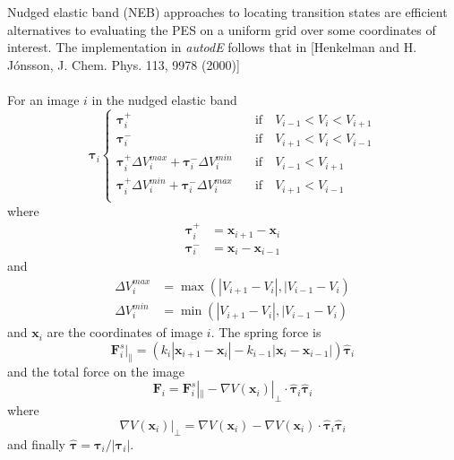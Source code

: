 \documentclass[10pt]{article}
\begin{document}
Nudged elastic band (NEB) approaches to locating transition states are efficient alternatives to evaluating the PES on a uniform grid over some coordinates of interest. The implementation in \emph{autodE} follows that in [Henkelman and H. Jónsson, J. Chem. Phys. 113, 9978 (2000)]
\\\\
For an image $i$ in the nudged elastic band
\begin{equation}
\boldsymbol{\tau}_i
\begin{cases}
\boldsymbol{\tau}_i^+ &\quad\text{if}\quad V_{i-1} < V_i < V_{i+1} \\
\boldsymbol{\tau}_i^- &\quad\text{if}\quad V_{i+1} < V_i < V_{i-1} \\
\boldsymbol{\tau}_i^+\Delta V_i^{max} + \boldsymbol{\tau}_i^-\Delta V_i^{min} &\quad\text{if}\quad V_{i-1} <  V_{i+1} \\
\boldsymbol{\tau}_i^+\Delta V_i^{min} + \boldsymbol{\tau}_i^-\Delta V_i^{max} &\quad\text{if}\quad V_{i+1} < V_{i-1} \\
\end{cases}
\end{equation}
where
\begin{equation}
\begin{aligned}
\boldsymbol{\tau}_i^+ &= \boldsymbol{x}_{i+1} - \boldsymbol{x}_i \\
\boldsymbol{\tau}_i^- &= \boldsymbol{x}_{i} - \boldsymbol{x}_{i-1}
\end{aligned}
\end{equation}
and
\begin{equation}
\begin{aligned}
\Delta V_i^{max} &= \max(|V_{i+1} - V_i|, |V_{i-1} - V_i) \\
\Delta V_i^{min} &= \min(|V_{i+1} - V_i|, |V_{i-1} - V_i)
\end{aligned}
\end{equation}
and $\boldsymbol{x}_i$ are the coordinates of image $i$. The spring force is
\begin{equation}
\boldsymbol{F}^s_i|_{\parallel} = (k_i|\boldsymbol{x}_{i+1} - \boldsymbol{x}_i| - k_{i-1}|\boldsymbol{x}_i - \boldsymbol{x}_{i-1}|) \hat{\boldsymbol{\tau}}_i
\end{equation}
and the total force on the image
\begin{equation}
\boldsymbol{F}_i = \boldsymbol{F}^s_i|_{\parallel} - \nabla V(\boldsymbol{x}_i)|_\perp\cdot\hat{\boldsymbol{\tau}}_i\hat{\boldsymbol{\tau}}_i
\end{equation}
where
\begin{equation}
\nabla V(\boldsymbol{x}_i)|_\perp = \nabla V(\boldsymbol{x}_i) - \nabla V(\boldsymbol{x}_i)\cdot \hat{\boldsymbol{\tau}}_i\hat{\boldsymbol{\tau}}_i
\end{equation}
and finally $\hat{\boldsymbol{\tau}} = \boldsymbol{\tau}_i/|\boldsymbol{\tau}_i|$.
\end{document}
